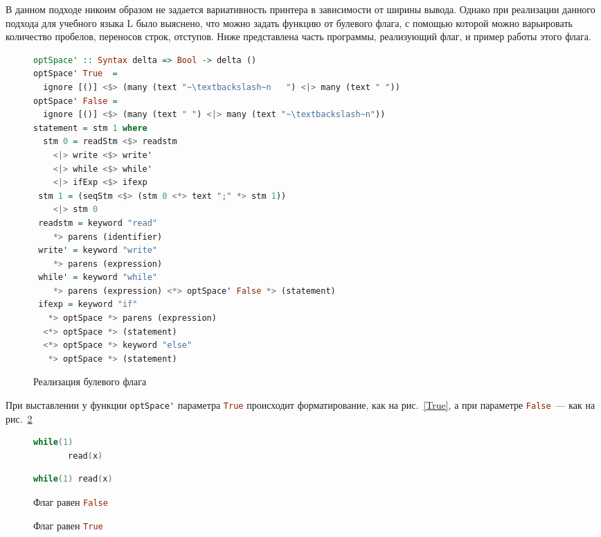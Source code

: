 В данном подходе никоим образом не задается вариативность принтера в зависимости от ширины вывода. 
Однако при реализации данного подхода для учебного языка L было выяснено, что можно задать функцию от 
булевого флага, с помощью которой можно варьировать количество пробелов, переносов строк, отступов. 
Ниже представлена часть программы, реализующий флаг, и пример работы этого флага. 

\begin{figure}[ht]
\centering
\begin{lstlisting}[language=Haskell]
optSpace' :: Syntax delta => Bool -> delta ()
optSpace' True  = 
  ignore [()] <$> (many (text "~\textbackslash~n   ") <|> many (text " "))
optSpace' False = 
  ignore [()] <$> (many (text " ") <|> many (text "~\textbackslash~n"))
statement = stm 1 where
  stm 0 = readStm <$> readstm
    <|> write <$> write'
    <|> while <$> while'
    <|> ifExp <$> ifexp
 stm 1 = (seqStm <$> (stm 0 <*> text ";" *> stm 1))
    <|> stm 0
 readstm = keyword "read"
    *> parens (identifier)
 write' = keyword "write"		  
    *> parens (expression)
 while' = keyword "while"
    *> parens (expression) <*> optSpace' False *> (statement)
 ifexp = keyword "if"
   *> optSpace *> parens (expression)
  <*> optSpace *> (statement) 
  <*> optSpace *> keyword "else"  
   *> optSpace *> (statement)	
\end{lstlisting}
\caption{Реализация булевого флага}
\label{boolFlag1}
\end{figure}

При выставлении у функции \lstinline[language=Haskell]{optSpace'} параметра 
\lstinline[language=Haskell]{True} происходит форматирование, как на рис.~\ref{True}, 
а при параметре \lstinline[language=Haskell]{False}~--- как на рис.~\ref{False}

\begin{figure}[h]
  \centering
  \begin{minipage}[h]{0.4\textwidth}
    \begin{lstlisting}[language = C]
    while(1)
       read(x)
    \end{lstlisting}
    \caption{Флаг равен \lstinline[language=Haskell]{True}}
    \label{True}
  \end{minipage}
  \hfill
  \begin{minipage}[h]{0.4\textwidth}
    \begin{lstlisting}[language = C]
    while(1) read(x)
    \end{lstlisting}
    \caption{Флаг равен \lstinline[language=Haskell]{False}}
    \label{False}
  \end{minipage}
\end{figure}


